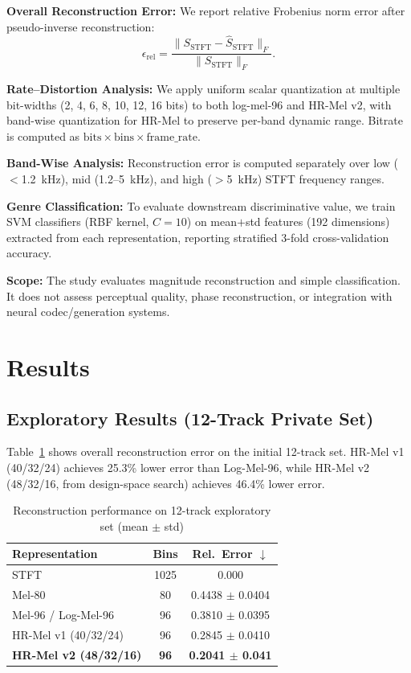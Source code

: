 \documentclass[twocolumn]{article}
\begin{document}
\textbf{Overall Reconstruction Error:} We report relative Frobenius norm error after pseudo-inverse reconstruction:
\begin{equation}
\epsilon_{\text{rel}} = \frac{\|S_{\text{STFT}} - \hat{S}_{\text{STFT}}\|_F}{\|S_{\text{STFT}}\|_F}.
\end{equation}

\textbf{Rate--Distortion Analysis:} We apply uniform scalar quantization at multiple bit-widths (2, 4, 6, 8, 10, 12, 16 bits) to both log-mel-96 and HR-Mel v2, with band-wise quantization for HR-Mel to preserve per-band dynamic range. Bitrate is computed as $\text{bits} \times \text{bins} \times \text{frame\_rate}$.

\textbf{Band-Wise Analysis:} Reconstruction error is computed separately over low ($<$1.2~kHz), mid (1.2--5~kHz), and high ($>$5~kHz) STFT frequency ranges.

\textbf{Genre Classification:} To evaluate downstream discriminative value, we train SVM classifiers (RBF kernel, $C{=}10$) on mean$+$std features (192 dimensions) extracted from each representation, reporting stratified 3-fold cross-validation accuracy.

\textbf{Scope:} The study evaluates magnitude reconstruction and simple classification. It does not assess perceptual quality, phase reconstruction, or integration with neural codec/generation systems.

\section{Results}

\subsection{Exploratory Results (12-Track Private Set)}

Table~\ref{tab:overall_12} shows overall reconstruction error on the initial 12-track set. HR-Mel v1 (40/32/24) achieves 25.3\% lower error than Log-Mel-96, while HR-Mel v2 (48/32/16, from design-space search) achieves 46.4\% lower error.

\begin{table}[t]
\centering
\caption{Reconstruction performance on 12-track exploratory set (mean $\pm$ std)}
\label{tab:overall_12}
\small
\begin{tabular}{@{}lcc@{}}
\toprule
Representation & Bins & Rel.\ Error $\downarrow$ \\
\midrule
STFT & 1025 & 0.000 \\
\midrule
Mel-80 & 80 & 0.4438 $\pm$ 0.0404 \\
Mel-96 / Log-Mel-96 & 96 & 0.3810 $\pm$ 0.0395 \\
HR-Mel v1 (40/32/24) & 96 & 0.2845 $\pm$ 0.0410 \\
\textbf{HR-Mel v2 (48/32/16)} & \textbf{96} & \textbf{0.2041 $\pm$ 0.041} \\
\bottomrule
\end{tabular}
\end{table}
\end{document}
